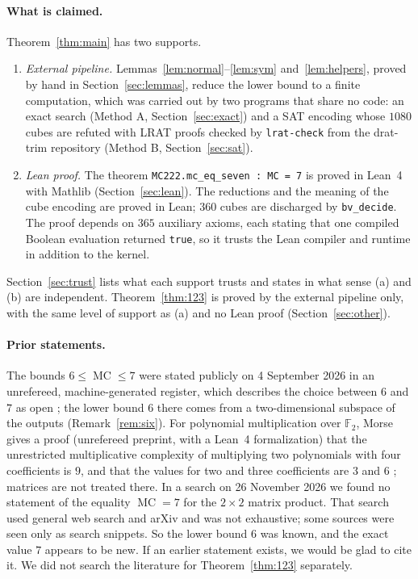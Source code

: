 \documentclass[11pt,a4paper]{article}
\theoremstyle{definition}
\newcommand{\F}{\mathbb{F}}
\newcommand{\MC}{\operatorname{MC}}
\newcommand{\code}[1]{\texttt{#1}}
\begin{document}
\paragraph{What is claimed.} Theorem~\ref{thm:main} has two supports.
\begin{enumerate}
\item[(a)] \emph{External pipeline.} Lemmas~\ref{lem:normal}--\ref{lem:sym} and~\ref{lem:helpers}, proved by hand in Section~\ref{sec:lemmas}, reduce the lower bound to a finite computation, which was carried out by two programs that share no code: an exact search (Method A, Section~\ref{sec:exact}) and a SAT encoding whose $1080$ cubes are refuted with LRAT proofs checked by \code{lrat-check} from the drat-trim repository (Method B, Section~\ref{sec:sat}).
\item[(b)] \emph{Lean proof.} The theorem \code{MC222.mc\_eq\_seven : MC = 7} is proved in Lean~4 with Mathlib (Section~\ref{sec:lean}). The reductions and the meaning of the cube encoding are proved in Lean; $360$ cubes are discharged by \code{bv\_decide}. The proof depends on $365$ auxiliary axioms, each stating that one compiled Boolean evaluation returned \code{true}, so it trusts the Lean compiler and runtime in addition to the kernel.
\end{enumerate}
Section~\ref{sec:trust} lists what each support trusts and states in what sense (a) and (b) are independent. Theorem~\ref{thm:123} is proved by the external pipeline only, with the same level of support as (a) and no Lean proof (Section~\ref{sec:other}).

\paragraph{Prior statements.} The bounds $6\le \MC\le 7$ were stated publicly on 4 September 2026 in an unrefereed, machine-generated register, which describes the choice between $6$ and $7$ as open \cite{SDMF149,SDMF180,SDML088}; the lower bound $6$ there comes from a two-dimensional subspace of the outputs (Remark~\ref{rem:six}). For polynomial multiplication over $\F_2$, Morse gives a proof (unrefereed preprint, with a Lean~4 formalization) that the unrestricted multiplicative complexity of multiplying two polynomials with four coefficients is $9$, and that the values for two and three coefficients are $3$ and $6$ \cite{Morse26}; matrices are not treated there. In a search on 26 November 2026 we found no statement of the equality $\MC=7$ for the $2\times2$ matrix product. That search used general web search and arXiv and was not exhaustive; some sources were seen only as search snippets. So the lower bound $6$ was known, and the exact value $7$ appears to be new. If an earlier statement exists, we would be glad to cite it. We did not search the literature for Theorem~\ref{thm:123} separately.
\end{document}
